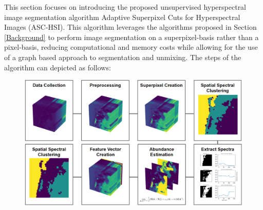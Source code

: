 This section focuses on introducing the proposed unsupervised hyperspectral image segmentation algorithm Adaptive Superpixel Cuts for Hyperspectral Images (ASC-HSI). This algorithm leverages the algorithms proposed in Section \ref{Background} to perform image segmentation on a superpixel-basis rather than a pixel-basis, reducing computational and memory costs while allowing for the use of a graph based approach to segmentation and unmixing. The steps of the algorithm can depicted as follows:
\begin{figure}[h]
    \centering %
    \includegraphics[scale=0.4]{algorithm_view.png}  %
    \label{fig:label}  %
  \end{figure}
  

